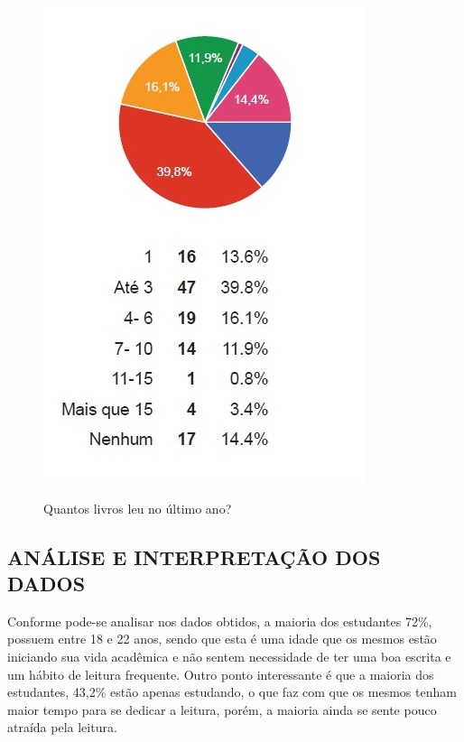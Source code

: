 \documentclass[
	article,			%
	11pt,				%
	oneside,			%
	a4paper,			%
	english,			%
	brazil,				%
	sumario=tradicional
	]{abntex2}
\begin{document}
\begin{figure}[h]  
	\begin{center} 
		\begin{center}
			\changecaptionwidth 
			\captionwidth{13.5cm} %
			\caption{\label{livroslidos} Quantos livros leu no último ano?}
			{\includegraphics[scale=0.8]{imagens/livroslidos}}
		\end{center}
	\end{center}
\end{figure}
\FloatBarrier



\subsection{ANÁLISE E INTERPRETAÇÃO DOS DADOS}
Conforme pode-se analisar nos dados obtidos, a maioria dos estudantes 72\%, possuem entre 18 e 22 anos, sendo que esta é uma idade que os mesmos estão iniciando sua vida acadêmica e não sentem necessidade de ter uma boa escrita e um hábito de leitura frequente. Outro ponto interessante é que a maioria dos estudantes, 43,2\% estão apenas estudando, o que faz com que os mesmos tenham maior tempo para se dedicar a leitura, porém, a maioria ainda se sente pouco atraída pela leitura.
\end{document}
